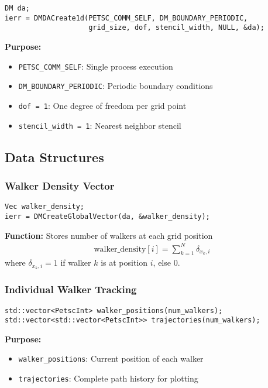 \documentclass[11pt,a4paper]{article}
\begin{document}
\begin{lstlisting}[caption=1D DMDA creation with periodic boundaries]
DM da;
ierr = DMDACreate1d(PETSC_COMM_SELF, DM_BOUNDARY_PERIODIC, 
                    grid_size, dof, stencil_width, NULL, &da);
\end{lstlisting}

\textbf{Purpose:}
\begin{itemize}
    \item \texttt{PETSC\_COMM\_SELF}: Single process execution
    \item \texttt{DM\_BOUNDARY\_PERIODIC}: Periodic boundary conditions
    \item \texttt{dof = 1}: One degree of freedom per grid point
    \item \texttt{stencil\_width = 1}: Nearest neighbor stencil
\end{itemize}

\subsection{Data Structures}

\subsubsection{Walker Density Vector}
\begin{lstlisting}[caption=Grid-based walker density]
Vec walker_density;
ierr = DMCreateGlobalVector(da, &walker_density);
\end{lstlisting}

\textbf{Function:} Stores number of walkers at each grid position
\begin{align}
\text{walker\_density}[i] = \sum_{k=1}^{N} \delta_{x_k, i}
\end{align}
where $\delta_{x_k, i} = 1$ if walker $k$ is at position $i$, else $0$.

\subsubsection{Individual Walker Tracking}
\begin{lstlisting}[caption=Walker position arrays]
std::vector<PetscInt> walker_positions(num_walkers);
std::vector<std::vector<PetscInt>> trajectories(num_walkers);
\end{lstlisting}

\textbf{Purpose:}
\begin{itemize}
    \item \texttt{walker\_positions}: Current position of each walker
    \item \texttt{trajectories}: Complete path history for plotting
\end{itemize}
\end{document}
